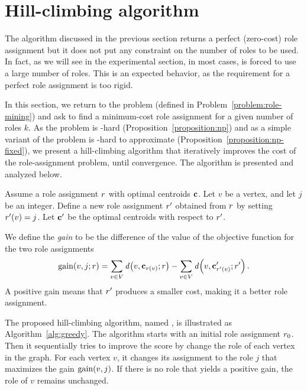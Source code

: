 \section{Hill-climbing algorithm}
\label{section:greedy}

The algorithm discussed in the previous section
returns a perfect (zero-cost) role assignment
but it does not put any constraint on the number of roles to be used.
In fact, as we will see in the experimental section, 
in most cases, \algperfect is forced to use a large number of roles. 
This is an expected behavior, 
as the requirement for a perfect role assignment is too rigid.

In this section, we return to the \prbrm problem
(defined in Problem~\ref{problem:role-mining})
and ask to find a minimum-cost role assignment
for a given number of roles $k$.
As the \prbrm problem is \np-hard (Proposition~\ref{proposition:np}) and
as a simple variant of the problem is \np-hard to approximate (Proposition~\ref{proposition:np-fixed}), 
we present a hill-climbing algorithm
that iteratively improves the cost of the role-assignment problem, 
until convergence.
The algorithm is presented and analyzed below.

Assume a role assignment $r$ with optimal centroids $\mathbf{c}$. 
Let $v$ be a vertex, and let $j$ be an integer.
Define a new role assignment $r'$ obtained from $r$ by setting $r'(v) = j$.
Let $\mathbf{c}'$ be the optimal centroids with respect to $r'$.

We define the \emph{gain} to be the difference
of the value of the objective function for the two role assignments 
\[
\gain{v, j; \role} = 
	\sum_{v \in V} \dist{v, \centroid_{\role(v)}; \role} - \sum_{v \in V} \dist{v, \centroid'_{\role'(v)}; \role'}.
\]
A positive gain means that $r'$ produces a smaller cost, making it a better role assignment.

\iffalse
i -> j
\[
	- c_i\norm{\centroid_i}^2 + (c_i - 1)\norm{\centroid_i'}^2
	+ c_j\norm{\centroid_j}^2 - (c_i + 1)\norm{\centroid_j'}^2
\]

\[
	+ \prof{w}_i^2  -  (\prof{w}_i - 1)^2
	- \prof{w}_j^2  +  (\prof{w}_j - 1)^2
\]

\[
	2\prof{w}_i - 2\prof{w}_j 
\]

\[
	-c_\ell ((\centroid_\ell)^2_i - (\centroid_\ell')^2_i
	-(\centroid_\ell)^2_j + (\centroid_\ell')^2_j)
\]

\[
	- 2(\centroid_\ell)_i  + 2(\centroid_\ell)_j  
\]
\fi

The proposed hill-climbing algorithm,
named \alggreedy, 
is illustrated as Algorithm~\ref{alg:greedy}. 
The algorithm starts with an initial role assignment ${r}_{0}$.
Then it sequentially tries to improve the score by change the role of each vertex in the graph.
For each vertex $v$, it changes its assignment to the role $j$
that maximizes the gain $\gain{v, j}$. 
If there is no role that yields a positive gain, 
the role of $v$ remains unchanged.


